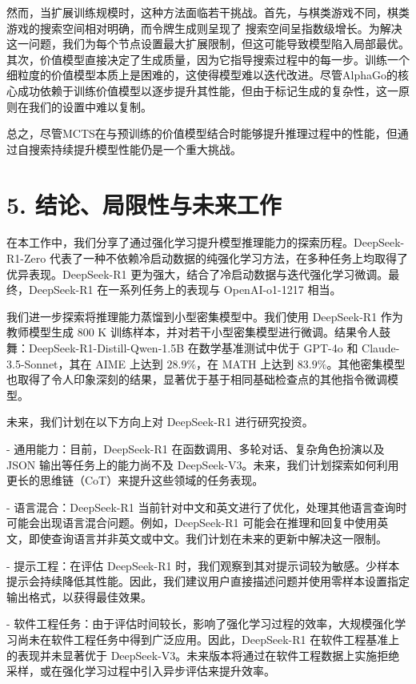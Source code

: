 \documentclass[12pt,a4paper]{report} %
\begin{document}
然而，当扩展训练规模时，这种方法面临若干挑战。首先，与棋类游戏不同，棋类游戏的搜索空间相对明确，而令牌生成则呈现了
搜索空间呈指数级增长。为解决这一问题，我们为每个节点设置最大扩展限制，但这可能导致模型陷入局部最优。其次，价值模型直接决定了生成质量，因为它指导搜索过程中的每一步。训练一个细粒度的价值模型本质上是困难的，这使得模型难以迭代改进。尽管AlphaGo的核心成功依赖于训练价值模型以逐步提升其性能，但由于标记生成的复杂性，这一原则在我们的设置中难以复制。


总之，尽管MCTS在与预训练的价值模型结合时能够提升推理过程中的性能，但通过自搜索持续提升模型性能仍是一个重大挑战。


\section*{5. 结论、局限性与未来工作}


在本工作中，我们分享了通过强化学习提升模型推理能力的探索历程。DeepSeek-R1-Zero 代表了一种不依赖冷启动数据的纯强化学习方法，在多种任务上均取得了优异表现。DeepSeek-R1 更为强大，结合了冷启动数据与迭代强化学习微调。最终，DeepSeek-R1 在一系列任务上的表现与 OpenAI-o1-1217 相当。


我们进一步探索将推理能力蒸馏到小型密集模型中。我们使用 DeepSeek-R1 作为教师模型生成 800 K 训练样本，并对若干小型密集模型进行微调。结果令人鼓舞：DeepSeek-R1-Distill-Qwen-1.5B 在数学基准测试中优于 GPT-4o 和 Claude-3.5-Sonnet，其在 AIME 上达到 $28.9 \%$，在 MATH 上达到 $83.9 \%$。其他密集模型也取得了令人印象深刻的结果，显著优于基于相同基础检查点的其他指令微调模型。


未来，我们计划在以下方向上对 DeepSeek-R1 进行研究投资。


- 通用能力：目前，DeepSeek-R1 在函数调用、多轮对话、复杂角色扮演以及 JSON 输出等任务上的能力尚不及 DeepSeek-V3。未来，我们计划探索如何利用更长的思维链（CoT）来提升这些领域的任务表现。


- 语言混合：DeepSeek-R1 当前针对中文和英文进行了优化，处理其他语言查询时可能会出现语言混合问题。例如，DeepSeek-R1 可能会在推理和回复中使用英文，即使查询语言并非英文或中文。我们计划在未来的更新中解决这一限制。


- 提示工程：在评估 DeepSeek-R1 时，我们观察到其对提示词较为敏感。少样本提示会持续降低其性能。因此，我们建议用户直接描述问题并使用零样本设置指定输出格式，以获得最佳效果。


- 软件工程任务：由于评估时间较长，影响了强化学习过程的效率，大规模强化学习尚未在软件工程任务中得到广泛应用。因此，DeepSeek-R1 在软件工程基准上的表现并未显著优于 DeepSeek-V3。未来版本将通过在软件工程数据上实施拒绝采样，或在强化学习过程中引入异步评估来提升效率。

\end{document}
